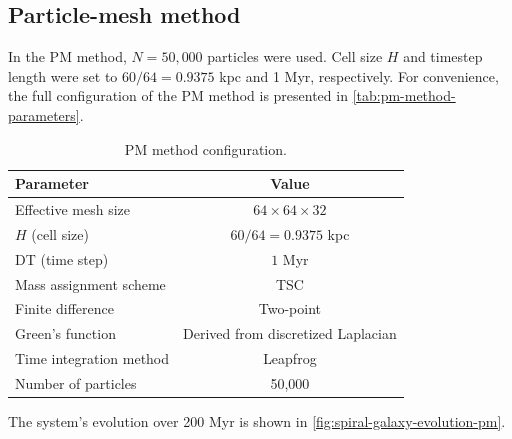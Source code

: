 \subsection{Particle-mesh method}
In the PM method, $N=50{,}000$ particles were used.
Cell size $H$ and timestep length were set to $60/64=0.9375$ kpc and 1 Myr, respectively.
For convenience, the full configuration of the PM method is presented in \autoref{tab:pm-method-parameters}.
\begin{table}[htp]
    \centering
    \begin{tabular}{|l|c|}
        \hline
        \textbf{Parameter}      & \textbf{Value}                     \\
        \hline
        Effective mesh size     & $64 \times 64 \times 32$           \\
        $H$ (cell size)         & $60/64=0.9375$ kpc                 \\
        DT (time step)          & $1$ Myr                            \\
        Mass assignment scheme  & TSC                                \\
        Finite difference       & Two-point                          \\
        Green's function        & Derived from discretized Laplacian \\
        Time integration method & Leapfrog                           \\
        Number of particles     & 50,000                             \\
        \hline
    \end{tabular}
    \caption{PM method configuration.}
    \label{tab:pm-method-parameters}
\end{table}
The system's evolution over 200 Myr is shown in \autoref{fig:spiral-galaxy-evolution-pm}.

